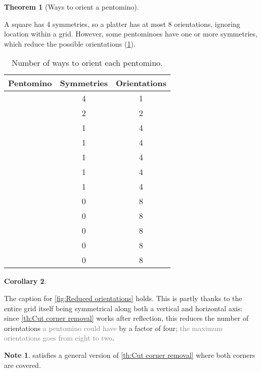 \documentclass{article}
\newcommand{\pentI}{\smash{\colorbox{colorI!50}{I}}}
\newcommand{\pentF}{\smash{\colorbox{colorF!50}{F}}}%
\newcommand{\pentL}{\smash{\colorbox{colorL!50}{L}}}%
\newcommand{\pentP}{\smash{\colorbox{colorP!50}{P}}}
\newcommand{\pentN}{\smash{\colorbox{colorN!50}{N}}}
\newcommand{\pentT}{\smash{\colorbox{colorT!50}{T}}}
\newcommand{\pentU}{\smash{\colorbox{colorU!50}{U}}}
\newcommand{\pentV}{\smash{\colorbox{colorV!50}{V}}}
\newcommand{\pentW}{\smash{\colorbox{colorW!50}{W}}}
\newcommand{\pentX}{\smash{\colorbox{colorX!50}{X}}}
\newcommand{\pentY}{\smash{\colorbox{colorY!50}{Y}}}
\newcommand{\pentZ}{\smash{\colorbox{colorZ!50}{Z}}}
\theoremstyle{definition}%
\newtheorem{theorem}{Theorem}[section]
\newtheorem{corollary}[theorem]{Corollary}%
\newtheorem*{note}{Note}
\newcommand{\minordetail}[1]{\textcolor{gray}{#1}}
\begin{document}
\newpage
\begin{theorem}[Ways to orient a pentomino]
\label{th:Pentomino orientations}

A square has 4 symmetries, so a platter has at most 8 orientations, ignoring location within a grid. However, some pentominoes have one or more symmetries, which reduce the possible orientations (\cref{tab:pentomino orientations}).

    \begin{table}
        \centering
        \caption{Number of ways to orient each pentomino. \cite[0:41]{v1}}
        \begin{tabular}{ccc}
            \toprule
            Pentomino & Symmetries & Orientations \\
            \midrule
            \pentX{} & 4 & 1 \\
            \pentI{} & 2 & 2 \\
            \pentT{} & 1 & 4 \\
            \pentU{} & 1 & 4 \\
            \pentV{} & 1 & 4 \\
            \pentW{} & 1 & 4 \\
            \pentZ{} & 1 & 4 \\
            \pentF{} & 0 & 8 \\
            \pentL{} & 0 & 8 \\
            \pentP{} & 0 & 8 \\
            \pentN{} & 0 & 8 \\
            \pentY{} & 0 & 8 \\
            \bottomrule
        \end{tabular}
        \label{tab:pentomino orientations}
    \end{table}
\end{theorem}

\begin{corollary}
\label{cor:cutcorner3xn}

The caption for \cref{fig:Reduced orientations} holds. This is partly thanks to the entire grid itself being symmetrical along both a vertical and horizontal axis: since \cref{th:Cut corner removal} works after reflection, this reduces the number of orientations \minordetail{a pentomino could have} by a factor of four; \minordetail{the maximum orientations goes from eight to two}.
\end{corollary}

\begin{note}
\pentU{} satisfies a general version of \cref{th:Cut corner removal} where both corners are covered.
\end{note}
\end{document}
